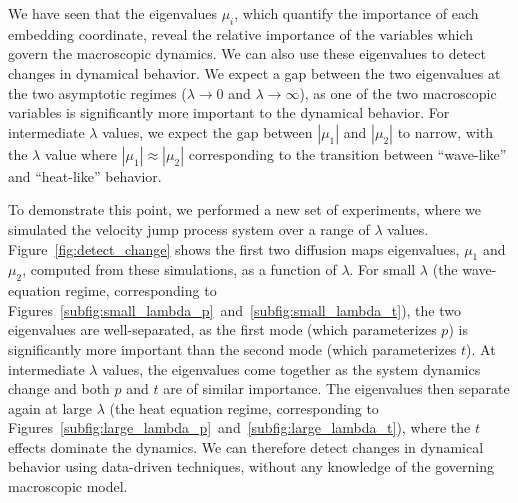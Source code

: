 \documentclass[preprint]{elsarticle}
\begin{document}
We have seen that the eigenvalues $\mu_i$, which quantify the importance of each embedding coordinate, reveal the relative importance of the variables which govern the macroscopic dynamics.
%
We can also use these eigenvalues to detect changes in dynamical behavior.
%
We expect a gap between the two eigenvalues at the two asymptotic regimes ($\lambda \rightarrow 0$ and $\lambda \rightarrow \infty$), as one of the two macroscopic variables is significantly more important to the dynamical behavior.
%
For intermediate $\lambda$ values, we expect the gap between $|\mu_1|$ and $|\mu_2|$ to narrow, with the $\lambda$ value where $|\mu_1| \approx |\mu_2|$ corresponding to the transition between ``wave-like'' and ``heat-like'' behavior. 

To demonstrate this point, we performed a new set of experiments, where we simulated the velocity jump process system over a range of $\lambda$ values. 
% 
Figure~\ref{fig:detect_change} shows the first two diffusion maps eigenvalues, $\mu_1$ and $\mu_2$, computed from these simulations, as a function of $\lambda$.
%
For small $\lambda$ (the wave-equation regime, corresponding to Figures~\ref{subfig:small_lambda_p}~and~\ref{subfig:small_lambda_t}), the two eigenvalues are well-separated, as the first mode (which parameterizes $p$) is significantly more important than the second mode (which parameterizes $t$).
%
At intermediate $\lambda$ values, the eigenvalues come together as the system dynamics change and both $p$ and $t$ are of similar importance.
%
The eigenvalues then separate again at large $\lambda$ (the heat equation regime, corresponding to Figures~\ref{subfig:large_lambda_p}~and~\ref{subfig:large_lambda_t}), where the $t$ effects dominate the dynamics.
%
We can therefore detect changes in dynamical behavior using data-driven techniques, without any knowledge of the governing macroscopic model. 

\end{document}
